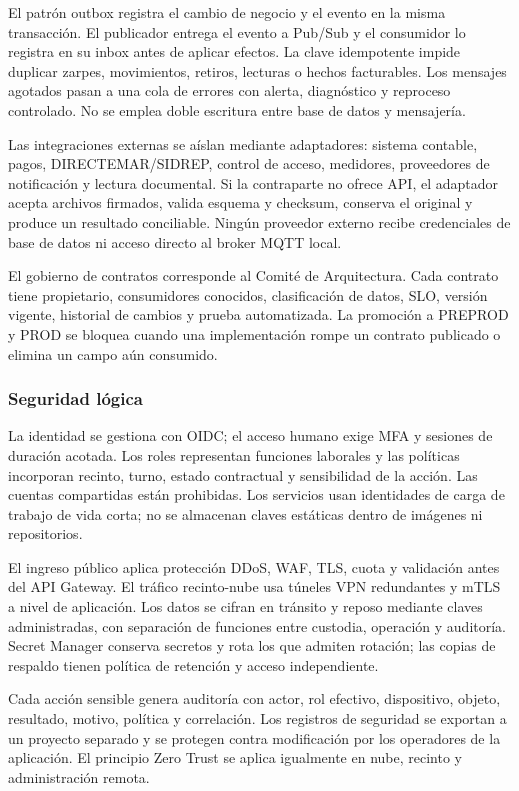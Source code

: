 \documentclass[11pt,letterpaper]{report}
\begin{document}
El patrón outbox registra el cambio de negocio y el evento en la misma transacción. El publicador entrega el evento a Pub/Sub y el consumidor lo registra en su inbox antes de aplicar efectos. La clave idempotente impide duplicar zarpes, movimientos, retiros, lecturas o hechos facturables. Los mensajes agotados pasan a una cola de errores con alerta, diagnóstico y reproceso controlado. No se emplea doble escritura entre base de datos y mensajería.

Las integraciones externas se aíslan mediante adaptadores: sistema contable, pagos, DIRECTEMAR/SIDREP, control de acceso, medidores, proveedores de notificación y lectura documental. Si la contraparte no ofrece API, el adaptador acepta archivos firmados, valida esquema y checksum, conserva el original y produce un resultado conciliable. Ningún proveedor externo recibe credenciales de base de datos ni acceso directo al broker MQTT local.

El gobierno de contratos corresponde al Comité de Arquitectura. Cada contrato tiene propietario, consumidores conocidos, clasificación de datos, SLO, versión vigente, historial de cambios y prueba automatizada. La promoción a PREPROD y PROD se bloquea cuando una implementación rompe un contrato publicado o elimina un campo aún consumido.

\subsubsection*{Seguridad lógica}

La identidad se gestiona con OIDC; el acceso humano exige MFA y sesiones de duración acotada. Los roles representan funciones laborales y las políticas incorporan recinto, turno, estado contractual y sensibilidad de la acción. Las cuentas compartidas están prohibidas. Los servicios usan identidades de carga de trabajo de vida corta; no se almacenan claves estáticas dentro de imágenes ni repositorios.

El ingreso público aplica protección DDoS, WAF, TLS, cuota y validación antes del API Gateway. El tráfico recinto-nube usa túneles VPN redundantes y mTLS a nivel de aplicación. Los datos se cifran en tránsito y reposo mediante claves administradas, con separación de funciones entre custodia, operación y auditoría. Secret Manager conserva secretos y rota los que admiten rotación; las copias de respaldo tienen política de retención y acceso independiente.

Cada acción sensible genera auditoría con actor, rol efectivo, dispositivo, objeto, resultado, motivo, política y correlación. Los registros de seguridad se exportan a un proyecto separado y se protegen contra modificación por los operadores de la aplicación. El principio Zero Trust se aplica igualmente en nube, recinto y administración remota.
\end{document}
